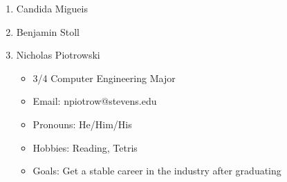 \begin{enumerate}
    \item Candida Migueis
    \item Benjamin Stoll
    \item Nicholas Piotrowski
        \begin{itemize}
        \item 3/4 Computer Engineering Major
        \item Email: npiotrow@stevens.edu
        \item Pronouns: He/Him/His
        \item Hobbies: Reading, Tetris
        \item Goals: Get a stable career in the industry after graduating
        \end{itemize}
\end{enumerate}
